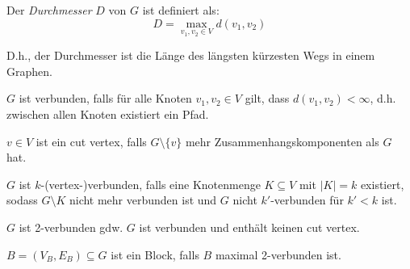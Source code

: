 \begin{definition}[Durchmesser]
    Der \textit{Durchmesser} $ D $ von $ G $ ist definiert als:
    \begin{equation*}
        D = \max_{v_1, v_2 \in V} d(v_1, v_2)
    \end{equation*}

    D.h., der Durchmesser ist die Länge des längsten kürzesten Wegs in einem Graphen.
\end{definition}

\begin{definition}[Verbundenheit]
    $ G $ ist verbunden, falls für alle Knoten $ v_1, v_2 \in V $ gilt, dass $ d(v_1, v_2) < \infty $, d.h. zwischen allen Knoten existiert ein Pfad.
\end{definition}

\begin{definition}
    $ v \in V $ ist ein cut vertex, falls $ G \setminus \{ v \} $ mehr Zusammenhangskomponenten als $ G $ hat.
\end{definition}

\begin{definition}
    $ G $ ist $ k $-(vertex-)verbunden, falls eine Knotenmenge $ K \subseteq V $ mit $ |K| = k $ existiert, sodass $ G \setminus K $ nicht mehr verbunden ist und $ G $ nicht $ k' $-verbunden für $ k' < k $ ist.
\end{definition}

\begin{proposition}
    $ G $ ist 2-verbunden gdw. $ G $ ist verbunden und enthält keinen cut vertex.
\end{proposition}

\begin{definition}[Block]
    $ B = (V_B, E_B) \subseteq G $ ist ein Block, falls $ B $ maximal 2-verbunden ist.
\end{definition}
